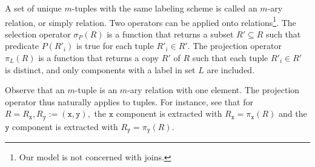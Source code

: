 \begin{mdframed}
A set of unique $m$-tuples with the same labeling scheme is called an $m$-ary
relation, or simply relation.  Two operators can be applied onto
relations\footnote{Our model is not concerned with joins.}.  The selection
operator $\sigma_P(R)$ is a function that returns a subset $R'\subseteq R$ such
that predicate $P(R'_i)$ is true for each tuple $R'_i\in R'$.  The projection
operator $\pi_L(R)$ is a function that returns a copy $R'$ of $R$ such that
each tuple $R'_i\in R'$ is distinct, and only components with a label in set
$L$ are included.

Observe that an $m$-tuple is an $m$-ary relation with one element.
The projection operator thus naturally applies to tuples. For instance, see that for
$R=R_\texttt{x},R_\texttt{y}:=(\texttt{x},\texttt{y}),$
the $\texttt{x}$ component is extracted with
$R_\texttt{x}=\pi_\texttt{x}(R)$
and the $\texttt{y}$ component is extracted with
$R_\texttt{y}=\pi_\texttt{y}(R)$.

\end{mdframed}


